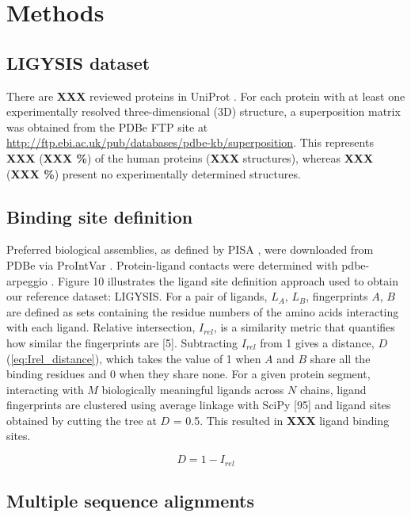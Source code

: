 \section{Methods}

\subsection{LIGYSIS dataset}

There are \textbf{XXX} reviewed proteins in UniProt \cite{UNIPROT_2019_UNIPROT}. For each protein with at least one experimentally resolved three-dimensional (3D) structure, a superposition matrix was obtained from the PDBe FTP site \cite{PDBE_2022_PDBEKB} at \url{http://ftp.ebi.ac.uk/pub/databases/pdbe-kb/superposition}. This represents \textbf{XXX} (\textbf{XXX \%}) of the human proteins (\textbf{XXX} structures), whereas \textbf{XXX} (\textbf{XXX \%}) present no experimentally determined structures. 

\subsection{Binding site definition}

Preferred biological assemblies, as defined by PISA \cite{KRISSINEL_2007_PISA}, were downloaded from PDBe via ProIntVar \cite{MACGOWAN_2020_DRSASP}. Protein-ligand contacts were determined with pdbe-arpeggio \cite{JUBB_2017_ARPEGGIO}. Figure 10 illustrates the ligand site definition approach used to obtain our reference dataset: LIGYSIS. For a pair of ligands, $L_{A}$, $L_{B}$, fingerprints $A$, $B$ are defined as sets containing the residue numbers of the amino acids interacting with each ligand. Relative intersection, $I_{rel}$, is a similarity metric that quantifies how similar the fingerprints are [5]. Subtracting $I_{rel}$ from 1 gives a distance, $D$ (\autoref{eq:Irel_distance}), which takes the value of 1 when $A$ and $B$ share all the binding residues and 0 when they share none. For a given protein segment, interacting with $M$ biologically meaningful ligands across $N$ chains, ligand fingerprints are clustered using average linkage with SciPy [95] and ligand sites obtained by cutting the tree at $D$ = 0.5. This resulted in \textbf{XXX} ligand binding sites.

\begin{equation}
D = 1 - I_{rel}
\label{eq:Irel_distance}
\end{equation}

\subsection{Multiple sequence alignments}

